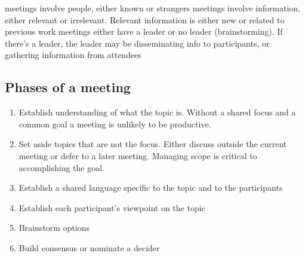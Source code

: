 meetings involve people, either known or strangers
meetings involve information, either relevant or irrelevant. Relevant information is either new or related to previous work
meetings either have a leader or no leader (brainstorming). If there's a leader, the leader may be disseminating info to participants, or gathering information from attendees


\subsection*{Phases of a meeting}

\begin{enumerate}
    \item Establish understanding of what the topic is. Without a shared focus and a common goal a meeting is unlikely to be productive. 
    \item Set aside topics that are not the focus. Either discuss outside the current meeting or defer to a later meeting. Managing scope is critical to accomplishing the goal. 
    \item Establish a shared language specific to the topic and to the participants
    \item Establish each participant's viewpoint on the topic
    \item Brainstorm options
    \item Build consensus or nominate a decider
\end{enumerate}